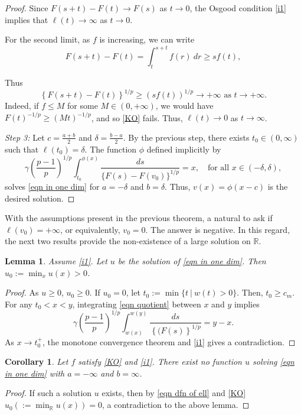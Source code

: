 \documentclass[11pt]{amsart}
\newtheorem{lemma}[theorem]{Lemma}
\newtheorem{corollary}[theorem]{Corollary}
\newcommand{\R}{\mathbb{R}}
\numberwithin{equation}{section}
\begin{document}
\begin{proof}
        Since $F(s+t)-F(t)\to F(s)$ as $t\to 0$, the Osgood condition \ref{i1} implies that $\ell(t)\to \infty$ as $t\to 0$. 
        
        For the second limit, as $f$ is increasing, we can write
        \begin{equation*}
           F(s+t)-F(t)=\int_{t}^{s+t}f(r)\ dr\geq sf(t), 
        \end{equation*}
    
       Thus 
       \begin{equation*}
           \left\{F(s+t)-F(t)\right\}^{1/p}\geq (sf(t))^{1/p}\to +\infty \text{ as } t\to +\infty.
       \end{equation*}
      Indeed, if $f\leq M$ for some $M\in (0,+\infty)$, we would have $F(t)^{-1/p}\geq (Mt)^{-1/p}$, and so \ref{KO} fails. Thus, $\ell(t)\to 0$ as $t\to \infty$.

      
  \textit{Step 3:}
        Let $c=\frac{a+b}{2}$ and $\delta=\frac{b-a}{2}$. By the previous step, there exists $t_{0}\in (0,\infty)$ such that $\ell(t_{0})=\delta$. The function $\phi$ defined implicitly by 
        \begin{equation*}
              \gamma\left(\frac{p-1}{p}\right)^{1/p}\int_{t_{0}}^{\phi(x)}\frac{ds}{\{F(s)-F(v_{0})\}^{1/p}}=x, \quad \text{for all } x\in (-\delta,\delta),
        \end{equation*}
         solves \eqref{eqn in one dim} for $a=-\delta$ and $b=\delta$. Thus, $v(x)=\phi(x-c)$ is the desired solution.
\end{proof}

 With the assumptions present in the previous theorem, a natural to ask if  $\ell(v_{0})=+\infty$, or equivalently, $v_{0}=0$. The answer is negative. In this regard, the next two results provide the non-existence of a large solution on $\R$.
\begin{lemma}
    Assume \ref{i1}. Let $u$ be the solution of \eqref{eqn in one dim}. Then $u_{0}:=\min_{x}u(x)> 0$.
\end{lemma}
\begin{proof}
    As $u\geq 0$, $u_{0}\geq 0$. If $u_{0}=0$, let $t_{0}:=\min\{t~|~w(t)>0\}$. Then, $t_{0}\geq c_{m}$. For any $t_{0}<x<y$, integrating \eqref{eqn quotient} between $x$ and $y$ implies
    \begin{equation*}
        \gamma \left(\frac{p-1}{p}\right)^{1/p}\int_{w(x)}^{w(y)}\frac{ds}{\left\{(F(s)\right\}^{1/p}}=y-x.
    \end{equation*}
    As $x\to t_{0}^{+}$, the monotone convergence theorem and \ref{i1} gives a contradiction. 
    \end{proof}
    \begin{corollary}
        Let $f$ satisfy \ref{KO} and \ref{i1}. There exist no function $u$ solving \eqref{eqn in one dim} with $a=-\infty$ and $b=\infty$. 
    \end{corollary}
    \begin{proof}
     If such a solution $u$ exists, then by \eqref{eqn dfn of ell} and \ref{KO} $u_{0}(:=\displaystyle\min_{\R}u(x))=0$, a contradiction to the above lemma.
    \end{proof}
    
\end{document}
